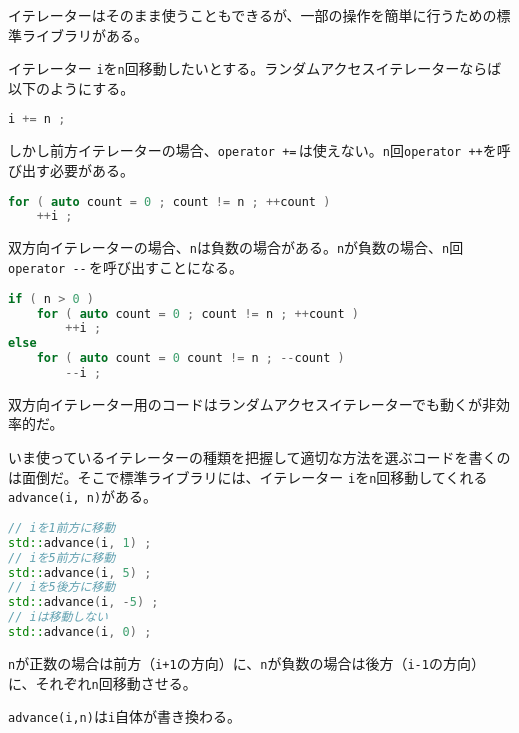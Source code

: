 \clearpage
{}

イテレーターはそのまま使うこともできるが、一部の操作を簡単に行うための標準ライブラリがある。


イテレーター \texttt{i}を\texttt{n}回移動したいとする。ランダムアクセスイテレーターならば以下のようにする。

\begin{lstlisting}[language={C++}]
i += n ;
\end{lstlisting}

しかし前方イテレーターの場合、\texttt{operator +=}\,は使えない。\texttt{n}回\texttt{operator ++}を呼び出す必要がある。

\begin{lstlisting}[language={C++}]
for ( auto count = 0 ; count != n ; ++count )
    ++i ;
\end{lstlisting}

双方向イテレーターの場合、\texttt{n}は負数の場合がある。\texttt{n}が負数の場合、\texttt{n}回\texttt{operator {-}{-}}\,を呼び出すことになる。

\begin{lstlisting}[language={C++}]
if ( n > 0 )
    for ( auto count = 0 ; count != n ; ++count )
        ++i ;
else
    for ( auto count = 0 count != n ; --count )
        --i ;
\end{lstlisting}

双方向イテレーター用のコードはランダムアクセスイテレーターでも動くが非効率的だ。

いま使っているイテレーターの種類を把握して適切な方法を選ぶコードを書くのは面倒だ。そこで標準ライブラリには、イテレーター \texttt{i}を\texttt{n}回移動してくれる\texttt{advance(i, n)}がある。

\begin{lstlisting}[language={C++}]
// iを1前方に移動
std::advance(i, 1) ;
// iを5前方に移動
std::advance(i, 5) ;
// iを5後方に移動
std::advance(i, -5) ;
// iは移動しない
std::advance(i, 0) ;
\end{lstlisting}

\texttt{n}が正数の場合は前方（\texttt{i+1}の方向）に、\texttt{n}が負数の場合は後方（\texttt{i-1}の方向）に、それぞれ\texttt{n}回移動させる。

\texttt{advance(i,n)}は\texttt{i}自体が書き換わる。

